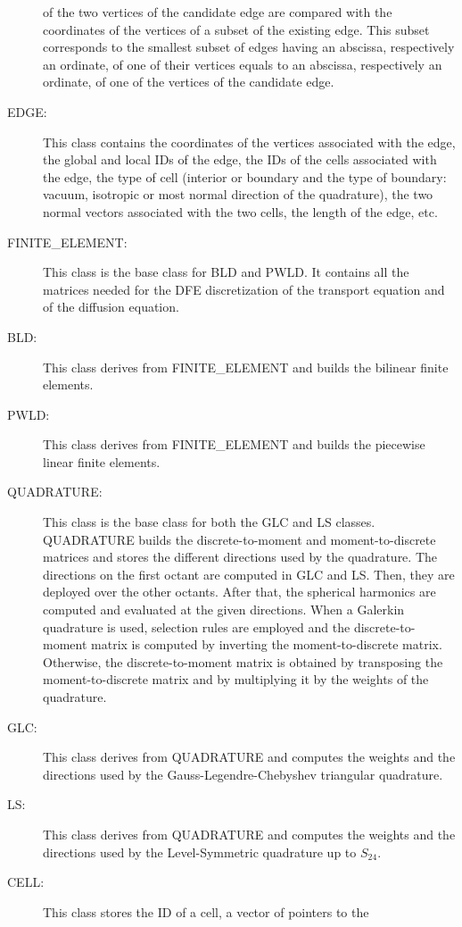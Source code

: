 \begin{description}
    of the two vertices of the candidate edge are compared with the
    coordinates of the vertices of a subset of the existing edge. This subset
    corresponds to the smallest subset of edges having an abscissa,
    respectively an ordinate, of one of their vertices equals to an abscissa,
    respectively an ordinate, of one of the vertices of the candidate edge.
  \item[EDGE:] This class contains the coordinates of the vertices associated
    with the edge, the global and local IDs of the edge, the IDs of the cells 
    associated with the edge, the type of cell (interior or boundary and 
    the type of boundary: vacuum, isotropic or most normal direction of the
    quadrature), the two normal vectors associated with the two cells, the 
    length of the edge, etc.
  \item[FINITE\_ELEMENT:] This class is the base class for BLD and PWLD.
    It contains all the matrices needed for the DFE discretization of the transport
    equation and of the diffusion equation.
  \item[BLD:] This class derives from FINITE\_ELEMENT and builds the bilinear
    finite elements.
  \item[PWLD:] This class derives from FINITE\_ELEMENT and builds the
    piecewise linear finite elements.
  \item[QUADRATURE:] This class is the base class for both the GLC and LS classes. 
    QUADRATURE builds the discrete-to-moment and moment-to-discrete matrices and
    stores the different directions used by the quadrature. The
    directions on the first octant are computed in GLC and LS. Then, they are
    deployed over the other octants. After that, the spherical harmonics
    are computed and evaluated at the given directions. When a Galerkin
    quadrature is used, selection rules are employed and the discrete-to-moment
    matrix is computed by inverting the moment-to-discrete matrix. Otherwise,
    the discrete-to-moment matrix is obtained by transposing the moment-to-discrete
    matrix and by multiplying it by the weights of the quadrature.
  \item[GLC:] This class derives from QUADRATURE and computes the weights and
    the directions used by the Gauss-Legendre-Chebyshev triangular quadrature.
  \item[LS:] This class derives from QUADRATURE and computes the weights and
    the directions used by the Level-Symmetric quadrature up to $S_{24}$.
  \item[CELL:] This class stores the ID of a cell, a vector of pointers to the

\end{description}
